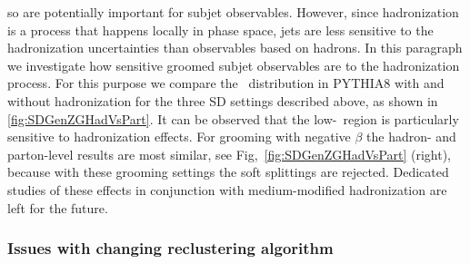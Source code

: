 so are potentially important for subjet observables.
However, since hadronization is a process that happens locally in phase space, jets are less sensitive to the hadronization uncertainties than observables based on hadrons. In this paragraph we investigate how sensitive groomed subjet observables are to the hadronization process. For this purpose we compare the \zg~distribution in PYTHIA8 with and without hadronization for the three SD settings described above, as shown in \autoref{fig:SDGenZGHadVsPart}. It can be observed that the low-\zg\, region is particularly sensitive to hadronization effects. For grooming with negative $\beta$ the hadron- and parton-level results are most similar, see Fig,~\ref{fig:SDGenZGHadVsPart} (right), because with these grooming settings the soft splittings are rejected. Dedicated studies of these effects in conjunction with medium-modified hadronization are left for the future.

\subsubsection{Issues with changing reclustering algorithm}
\label{sec:reclusteringalgo}

